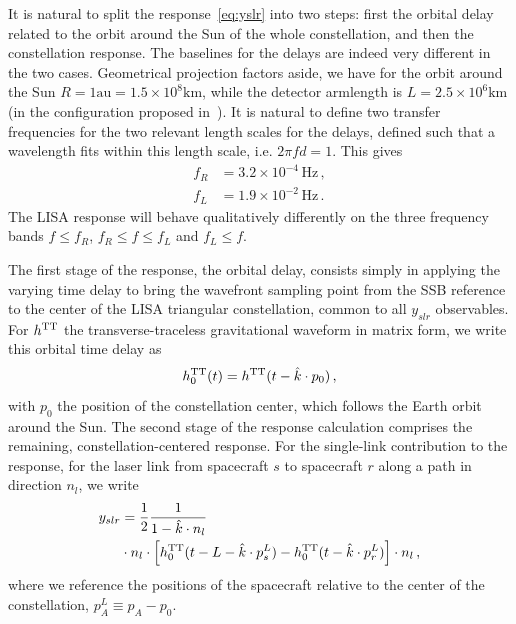 \documentclass[aps,showpacs,twocolumn,prd,superscriptaddress,nofootinbib]{revtex4-1}
\newcommand{\be}{\begin{equation}}
\newcommand{\ee}{\end{equation}}
\newcommand{\nn}{\nonumber}
\newcommand{\hatk}{\hat{k}}
\newcommand{\Hz}{\,\mathrm{Hz}}
\begin{document}
It is natural to split the response~\eqref{eq:yslr} into two steps: first the orbital delay related to the orbit around the Sun of the whole constellation, and then the constellation response. The baselines for the delays are indeed very different in the two cases. Geometrical projection factors aside, we have for the orbit around the Sun $R=1\text{au}=1.5\times 10^{8} \text{km}$, while the detector armlength is $L=2.5\times 10^{6}\text{km}$ (in the configuration proposed in~\cite{LISA17}). It is natural to define two transfer frequencies for the two relevant length scales for the delays, defined such that a wavelength fits within this length scale, i.e. $2\pi f d = 1$. This gives
\begin{subequations}\label{eq:transferfrequencies}
\begin{align}
	f_{R} &= 3.2\times10^{-4}\Hz \,,\\
	f_{L} &= 1.9\times 10^{-2}\Hz \,.
\end{align}
\end{subequations}
The LISA response will behave qualitatively differently on the three frequency bands $f \leq f_{R}$, $f_{R} \leq f \leq f_{L}$ and $f_{L} \leq f$.

The first stage of the response, the orbital delay, consists simply in applying the varying time delay to bring the wavefront sampling point from the SSB reference to the center of the LISA triangular constellation, common to all $y_{slr}$ observables. For $h^{\rm TT}$ the transverse-traceless gravitational waveform in matrix form, we write this orbital time delay as
\be\label{eq:defresponse0}
	h_{0}^{\rm TT} (t) = h^{\rm TT}(t-\hatk\cdot p_{0}) \,,
\ee
with $p_{0}$ the position of the constellation center, which follows the Earth orbit around the Sun. The second stage of the response calculation comprises the remaining, constellation-centered response. For the single-link contribution to the response, for the laser link from spacecraft $s$ to spacecraft $r$ along a path in direction $n_l$, we write
\begin{align}\label{eq:defresponseL}
	y_{slr} &= \frac{1}{2} \frac{1}{1 - \hatk\cdot n_{l}} \nn\\
	& \cdot n_{l}\cdot \left[ h_{0}^{\rm TT}(t - L - \hatk\cdot p^{L}_{s}) - h_{0}^{\rm TT}(t - \hatk\cdot p^{L}_{r}) \right] \cdot n_{l}\,,
\end{align}
where we reference the positions of the spacecraft relative to the center of the constellation, $p^{L}_{A} \equiv p_{A} - p_{0}$.
\end{document}
